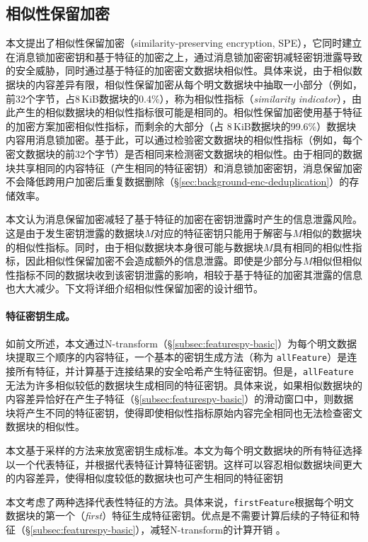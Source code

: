 
\subsection{相似性保留加密}
\label{subsec:featurespy-spe}

本文提出了相似性保留加密（similarity-preserving
encryption, SPE），它同时建立在消息锁加密密钥和基于特征的加密之上，通过消息锁加密密钥减轻密钥泄露导致的安全威胁，同时通过基于特征的加密密文数据块相似性。具体来说，由于相似数据块的内容差异有限，相似性保留加密从每个明文数据块中抽取一小部分（例如，前32个字节，占8\,KiB数据块的0.4\%），称为相似性指标（{\em similarity indicator}），由此产生的相似数据块的相似性指标很可能是相同的。相似性保留加密使用基于特征的加密方案加密相似性指标，而剩余的大部分（占 8\,KiB数据块的99.6\%）数据块内容用消息锁加密。基于此，\sysnameF 可以通过检验密文数据块的相似性指标（例如，每个密文数据块的前32个字节）是否相同来检测密文数据块的相似性。由于相同的数据块共享相同的内容特征（产生相同的特征密钥）和消息锁加密密钥，消息保留加密不会降低跨用户加密后重复数据删除（\S\ref{sec:background-enc-deduplication}）的存储效率。

本文认为消息保留加密减轻了基于特征的加密在密钥泄露时产生的信息泄露风险。这是由于发生密钥泄露的数据块$M$对应的特征密钥只能用于解密与$M$相似的数据块的相似性指标。同时，由于相似数据块本身很可能与数据块$M$具有相同的相似性指标，因此相似性保留加密不会造成额外的信息泄露。即使是少部分与$M$相似但相似性指标不同的数据块收到该密钥泄露的影响，相较于基于特征的加密其泄露的信息也大大减少。下文将详细介绍相似性保留加密的设计细节。

\paragraph*{特征密钥生成。}
如前文所述，本文通过N-transform（\S\ref{subsec:featurespy-basic}）为每个明文数据块提取三个顺序的内容特征，一个基本的密钥生成方法（称为 {\tt allFeature}）是连接所有特征，并计算基于连接结果的安全哈希产生特征密钥。但是，{\tt allFeature}无法为许多相似较低的数据块生成相同的特征密钥。具体来说，如果相似数据块的内容差异恰好在产生子特征（\S\ref{subsec:featurespy-basic}）的滑动窗口中，则数据块将产生不同的特征密钥，使得即使相似性指标原始内容完全相同也无法检查密文数据块的相似性。

本文基于采样的方法\cite{bhagwat2009extreme, dong2011Tradeoffs, qin17}来放宽密钥生成标准。本文为每个明文数据块的所有特征选择以一个代表特征，并根据代表特征计算特征密钥。这样可以容忍相似数据块间更大的内容差异，使得相似度较低的数据块也可产生相同的特征密钥

本文考虑了两种选择代表性特征的方法。具体来说，{\tt firstFeature}根据每个明文数据块的第一个（{\em first}）特征生成特征密钥。优点是不需要计算后续的子特征和特征（\S\ref{subsec:featurespy-basic}），减轻N-transform的计算开销 \cite{zhang2019Finesse}。

